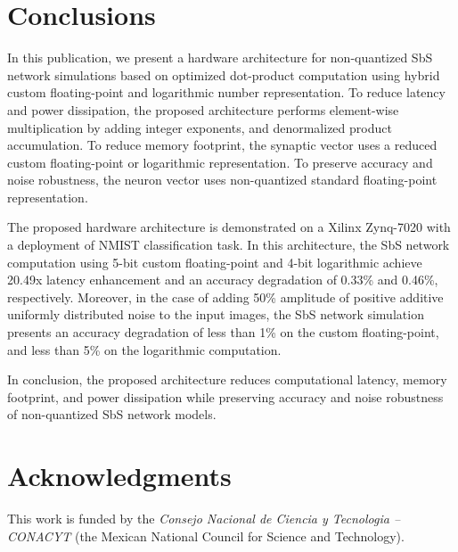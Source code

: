 \section{Conclusions}
In this publication, we present a hardware architecture for non-quantized SbS network simulations based on optimized dot-product computation using hybrid custom floating-point and logarithmic number representation. To reduce latency and power dissipation, the proposed architecture performs element-wise multiplication by adding integer exponents, and denormalized product accumulation. To reduce memory footprint, the synaptic vector uses a reduced custom floating-point or logarithmic representation. To preserve accuracy and noise robustness, the neuron vector uses non-quantized standard floating-point representation.

The proposed hardware architecture is demonstrated on a Xilinx Zynq-7020 with a deployment of NMIST classification task. In this architecture, the SbS network computation using 5-bit custom floating-point and 4-bit logarithmic achieve 20.49x latency enhancement and an accuracy degradation of 0.33\% and 0.46\%, respectively. Moreover, in the case of adding 50\% amplitude of positive additive uniformly distributed noise to the input images, the SbS network simulation presents an accuracy degradation of less than 1\% on the custom floating-point, and less than 5\% on the logarithmic computation.

In conclusion, the proposed architecture reduces computational latency, memory footprint, and power dissipation while preserving accuracy and noise robustness of non-quantized SbS network models.

\section * {Acknowledgments}\label{sec:Ack}
This work is funded by the \textit{Consejo Nacional de Ciencia y Tecnologia -- CONACYT} (the Mexican National Council for Science and Technology).
